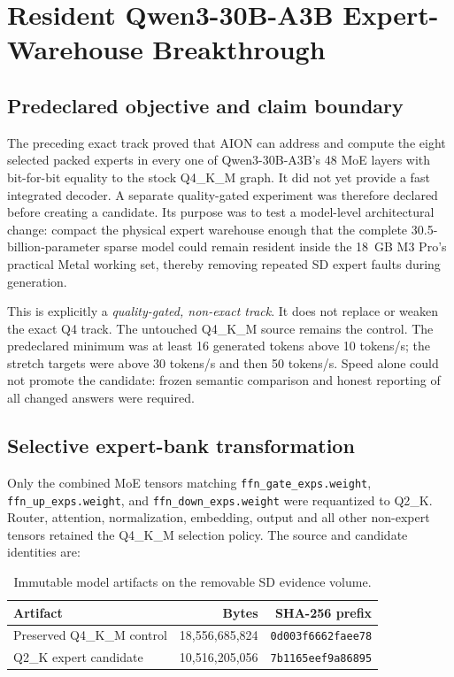\section{Resident Qwen3-30B-A3B Expert-Warehouse Breakthrough}
\label{sec:qwen30b-q2-resident-2026-09-09}

\subsection{Predeclared objective and claim boundary}

The preceding exact track proved that AION can address and compute the eight
selected packed experts in every one of Qwen3-30B-A3B's 48 MoE layers with
bit-for-bit equality to the stock Q4\_K\_M graph.  It did not yet provide a
fast integrated decoder.  A separate quality-gated experiment was therefore
declared before creating a candidate.  Its purpose was to test a model-level
architectural change: compact the physical expert warehouse enough that the
complete 30.5-billion-parameter sparse model could remain resident inside the
18~GB M3 Pro's practical Metal working set, thereby removing repeated SD expert
faults during generation.

This is explicitly a \emph{quality-gated, non-exact track}.  It does not replace
or weaken the exact Q4 track.  The untouched Q4\_K\_M source remains the control.
The predeclared minimum was at least 16 generated tokens above 10 tokens/s; the
stretch targets were above 30 tokens/s and then 50 tokens/s.  Speed alone could
not promote the candidate: frozen semantic comparison and honest reporting of
all changed answers were required.

\subsection{Selective expert-bank transformation}

Only the combined MoE tensors matching
\texttt{ffn\_gate\_exps.weight},
\texttt{ffn\_up\_exps.weight}, and
\texttt{ffn\_down\_exps.weight} were requantized to Q2\_K.  Router, attention,
normalization, embedding, output and all other non-expert tensors retained the
Q4\_K\_M selection policy.  The source and candidate identities are:
\begin{table}[ht]
\centering
\begin{tabular}{lrr}
\toprule
Artifact & Bytes & SHA-256 prefix \\
\midrule
Preserved Q4\_K\_M control & 18{,}556{,}685{,}824 & \texttt{0d003f6662faee78} \\
Q2\_K expert candidate & 10{,}516{,}205{,}056 & \texttt{7b1165eef9a86895} \\
\bottomrule
\end{tabular}
\caption{Immutable model artifacts on the removable SD evidence volume.}
\end{table}

